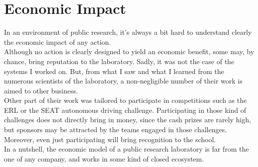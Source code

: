 \chapter{Economic Impact}

\label{economic}

In an environment of public research, it's always a bit hard to understand clearly the economic impact of any action.\\

Although no action is clearly designed to yield an economic benefit, some may, by chance, bring reputation to the laboratory.
Sadly, it was not the case of the systems I worked on.
But, from what I saw and what I learned from the numerous scientists of the laboratory, a non-negligible number of their work is aimed to other business.\\

Other part of their work was tailored to participate in competitions such as the ERL or the SEAT autonomous driving challenge.
Participating in those kind of challenges does not directly bring in money, since the cash prizes are rarely high, but sponsors may be attracted by the teams engaged in those challenges.
Moreover, even just participating will bring recognition to the school.\\

In a nutshell, the economic model of a public research laboratory is far from the one of any company, and works in some kind of closed ecosystem.

